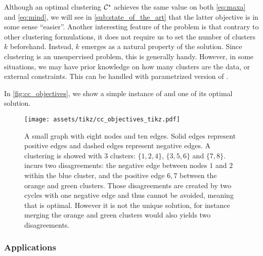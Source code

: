 Although an optimal clustering $\mathcal{C}^\star$ achieves the same value on both \eqref{eq:maxa}
and \eqref{eq:mind}, we will see in \autoref{sub:state_of_the_art} that the latter objective is in
some sense \enquote{easier}. Another interesting feature of the \pcc{} problem is that contrary to
other clustering formulations, it does not require us to set the number of clusters $k$ beforehand.
Instead, $k$ emerges as a natural property of the solution. Since clustering is an unsupervised
problem, this is generally handy. However, in some situations, we may have prior knowledge on how
many clusters are the data, or external constraints. This can be handled with parametrized version
of \pcc{}.

In \autoref{fig:cc_objectives}, we show a simple instance of \pcc{} and one of its optimal solution.
\begin{figure}[hbt]
	\centering
	\texttt{[image: assets/tikz/cc\_objectives\_tikz.pdf]}
	\caption[Small example of \pcc{}]{A small graph with eight nodes and ten edges. Solid edges
	represent positive edges and dashed edges represent negative edges. A clustering \cluster{}
	is showed with 3 clusters: $\{1, 2, 4\}$, $\{3, 5, 6\}$ and $\{7, 8\}$. \cluster{} incurs two
	disagreements: the negative edge between nodes $1$ and $2$ within the blue cluster, and the
	positive edge $6,7$ between the orange and green clusters. Those disagreements are created
	by two cycles with one negative edge and thus cannot be avoided, meaning that \cluster{} is
	optimal. However it is not the unique solution, for instance merging the orange and green
	clusters would also yields two disagreements.}
	\label{fig:cc_objectives}
\end{figure}

\subsubsection{Applications}
\label{ssub:cc_applications}

